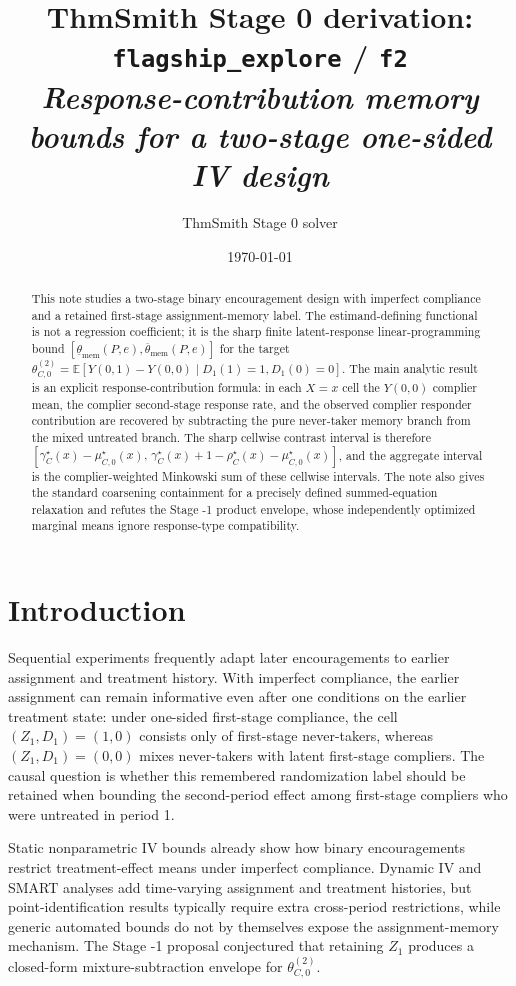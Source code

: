\documentclass[11pt]{article}
\title{ThmSmith Stage 0 derivation: \texttt{flagship\_explore} / \texttt{f2}%
  \\ \large\textit{Response-contribution memory bounds for a two-stage one-sided IV design}}
\author{ThmSmith Stage 0 solver}
\date{\today}
\newcommand{\E}{\mathbb{E}}
\theoremstyle{definition}
\theoremstyle{plain}
\theoremstyle{remark}
\begin{document}
\maketitle


\begin{abstract}
This note studies a two-stage binary encouragement design with imperfect compliance and a retained first-stage assignment-memory label.  The estimand-defining functional is not a regression coefficient; it is the sharp finite latent-response linear-programming bound
\([\underline\theta_{\mathrm{mem}}(P,e),\overline\theta_{\mathrm{mem}}(P,e)]\)
for the target
\(\theta_{C,0}^{(2)}=\E[Y(0,1)-Y(0,0)\mid D_1(1)=1,D_1(0)=0]\).
The main analytic result is an explicit response-contribution formula: in each \(X=x\) cell the \(Y(0,0)\) complier mean, the complier second-stage response rate, and the observed complier responder contribution are recovered by subtracting the pure never-taker memory branch from the mixed untreated branch.  The sharp cellwise contrast interval is therefore
\([\gamma_C^{\star}(x)-\mu_{C,0}^{\star}(x),\,\gamma_C^{\star}(x)+1-\rho_C^{\star}(x)-\mu_{C,0}^{\star}(x)]\), and the aggregate interval is the complier-weighted Minkowski sum of these cellwise intervals.  The note also gives the standard coarsening containment for a precisely defined summed-equation relaxation and refutes the Stage -1 product envelope, whose independently optimized marginal means ignore response-type compatibility.
\end{abstract}

\section{Introduction}
Sequential experiments frequently adapt later encouragements to earlier assignment and treatment history.  With imperfect compliance, the earlier assignment can remain informative even after one conditions on the earlier treatment state: under one-sided first-stage compliance, the cell \((Z_1,D_1)=(1,0)\) consists only of first-stage never-takers, whereas \((Z_1,D_1)=(0,0)\) mixes never-takers with latent first-stage compliers.  The causal question is whether this remembered randomization label should be retained when bounding the second-period effect among first-stage compliers who were untreated in period 1.

Static nonparametric IV bounds already show how binary encouragements restrict treatment-effect means under imperfect compliance.  Dynamic IV and SMART analyses add time-varying assignment and treatment histories, but point-identification results typically require extra cross-period restrictions, while generic automated bounds do not by themselves expose the assignment-memory mechanism.  The Stage -1 proposal conjectured that retaining \(Z_1\) produces a closed-form mixture-subtraction envelope for
\(\theta_{C,0}^{(2)}\).
\end{document}

